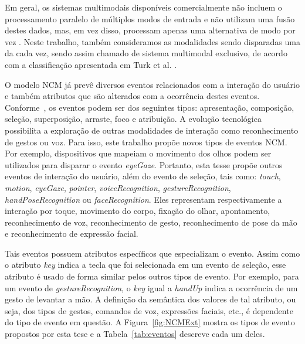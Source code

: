 Em geral, os sistemas multimodais disponíveis comercialmente não incluem o processamento paralelo de múltiplos modos de entrada e não utilizam uma fusão destes dados, mas, em vez disso, processam apenas uma alternativa de modo por vez \cite{furht2008encyclopedia}. Neste trabalho, também consideramos as modalidades sendo disparadas uma da cada vez, sendo assim chamado de sistema multimodal exclusivo, de acordo com a classificação apresentada em Turk et al. \cite{turk2014multimodal}.

O modelo NCM já prevê diversos eventos relacionados com a interação do usuário e também atributos que são alterados com a ocorrência destes eventos. Conforme~\cite{Soares:2005qy}, os eventos podem ser dos seguintes tipos: apresentação, composição, seleção, superposição, arraste, foco e atribuição. A evolução tecnológica possibilita a exploração de outras modalidades de interação como reconhecimento de gestos ou voz. Para isso, este trabalho propõe novos tipos de eventos NCM. Por exemplo, dispositivos que mapeiam o movimento dos olhos podem ser utilizados para disparar o evento \textit{eyeGaze}. Portanto, esta tesse propõe outros eventos de interação do usuário, além do evento de seleção, tais como: \textit{touch}, \textit{motion}, \textit{eyeGaze}, \textit{pointer}, \textit{voiceRecognition}, \textit{gestureRecognition}, \textit{handPoseRecognition} ou \textit{faceRecognition}. Eles representam respectivamente a interação por toque, movimento do corpo, fixação do olhar, apontamento, reconhecimento de voz, reconhecimento de gesto, reconhecimento de pose da mão e reconhecimento de expressão facial.  

Tais eventos possuem atributos específicos que especializam o evento. Assim como o atributo \textit{key} indica a tecla que foi selecionada em um evento de seleção, esse atributo é usado de forma similar pelos outros tipos de evento. Por exemplo, para um evento de \textit{gestureRecognition}, o \textit{key} igual a \textit{handUp} indica a ocorrência de um gesto de levantar a mão. A definição da semântica dos valores de tal atributo, ou seja, dos tipos de gestos, comandos de voz, expressões faciais, etc., é dependente do tipo de evento em questão. A Figura~\ref{fig:NCMExt} mostra os tipos de evento propostos por esta tese e a Tabela~\ref{tab:eventos} descreve cada um deles.

